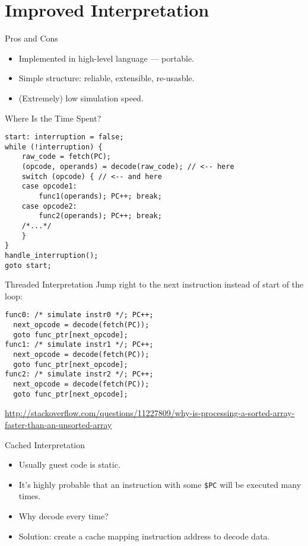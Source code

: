 \section{Improved Interpretation}

\begin{frame}{Pros and Cons}
\begin{itemize}
\item Implemented in high-level language --- portable.
\item Simple structure: reliable, extensible, re-usasble.
\pause
\item (Extremely) low simulation speed.
\end{itemize}
\end{frame}

\begin{frame}[fragile]{Where Is the Time Spent?}
\begin{lstlisting}
start: interruption = false;
while (!interruption) {
    raw_code = fetch(PC);
    (opcode, operands) = decode(raw_code); // <-- here
    switch (opcode) { // <-- and here
    case opcode1:
        func1(operands); PC++; break;
    case opcode2:
        func2(operands); PC++; break;
    /*...*/
    }
}
handle_interruption();
goto start;
\end{lstlisting}
\end{frame}

\begin{frame}[fragile]{Threaded Interpretation}
Jump right to the next instruction instead of start of the loop:
\bigskip
\begin{lstlisting}
func0: /* simulate instr0 */; PC++;
  next_opcode = decode(fetch(PC));
  goto func_ptr[next_opcode];
func1: /* simulate instr1 */; PC++;
  next_opcode = decode(fetch(PC));
  goto func_ptr[next_opcode];
func2: /* simulate instr2 */; PC++;
  next_opcode = decode(fetch(PC));
  goto func_ptr[next_opcode];
\end{lstlisting}

\tiny\url{http://stackoverflow.com/questions/11227809/why-is-processing-a-sorted-array-faster-than-an-unsorted-array}
\end{frame}

\begin{frame}{Cached Interpretation}
\begin{itemize}
\item Usually guest code is static.
\item It's highly probable that an instruction with some \texttt{\$PC} will be
  executed many times.
\item Why decode every time?
\item Solution: create a cache mapping instruction address to decode data.
\end{itemize}
\end{frame}

